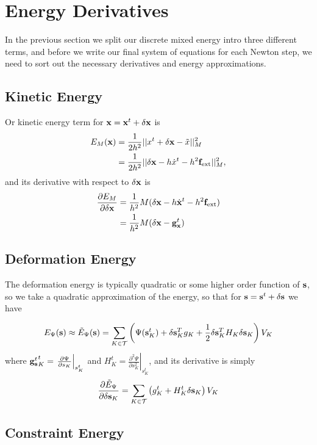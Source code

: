 
\section{Energy Derivatives}

In the previous section we split our discrete mixed energy intro three different terms, and before we write our final system of equations for each Newton step, we need to sort out the necessary derivatives and energy approximations.

\subsection{Kinetic Energy}
Or kinetic energy term for $\mathbf{x} = \mathbf{x}^t + \delta \mathbf{x}$ is
\begin{align}
E_M (\mathbf{x}) &= \frac{1}{2h^2} ||x^t + \delta \mathbf{x} - \tilde{x}||_M^2 \\
	&= \frac{1}{2h^2} ||\delta \mathbf{x} - h\dot{x}^t - h^2 \mathbf{f}_\text{ext} ||_M^2,
\end{align}
and its derivative with respect to $\delta \mathbf{x}$ is
\begin{equation}
\begin{split}
\frac{\partial E_M }{\partial \delta \mathbf{x}} &= \frac{1}{h^2}M(\delta \mathbf{x} - h\dot{\mathbf{x}}^t - h^2 \mathbf{f}_\text{ext}) \\
&=  \frac{1}{h^2}M(\delta \mathbf{x} -{\mathbf{g}_{\mathbf{x}}^t}) 
\end{split}
\end{equation}

\subsection{Deformation Energy}
The deformation energy is typically quadratic or some higher order function of $\mathbf{s}$, so we take a quadratic approximation of the energy, so that for $\mathbf{s}=\mathbf{s}^t + \delta \mathbf{s}$ we have

\begin{equation}
E_\Psi (\mathbf{s}) \approx \tilde{E}_\Psi (\mathbf{s}) = \sum_{K \in \mathcal{T}} \left(\Psi(\mathbf{s}_K^t) + \delta \mathbf{s}_K^T g_K + \frac{1}{2}\delta \mathbf{s}_K^T H_K \delta \mathbf{s}_K \right) V_K
\end{equation}
where 
${\mathbf{g}_{\mathbf{s}}^t}_K^t=\left.\frac{\partial \Psi}{\partial s_K}\right|_{s_K^t}$ and
$H_K^t=\left.\frac{\partial^2 \Psi}{\partial s_K^2}\right|_{s_K^t}$, and its derivative is simply
\begin{equation}
\frac{\partial \tilde{E}_\Psi}{\partial \delta \mathbf{s}_K} =
\sum_{K \in \mathcal{T}} \left(g_K^t + H_K^t \delta \mathbf{s}_K \right) V_K
\end{equation}


\subsection{Constraint Energy}

